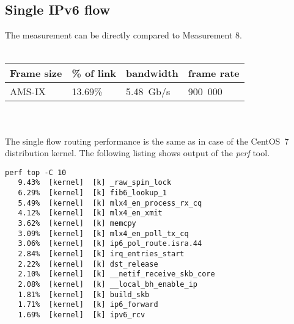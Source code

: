 
\subsection{Single IPv6 flow}
The measurement can be directly compared to Measurement 8.
\\
\\
\begin{tabular}{ | l | l | l | l | }
\hline
Frame size & \% of link & bandwidth & frame rate \\
\hline
AMS-IX & 13.69\% &  5.48~Gb/s & 900~000 \\
\hline
\end{tabular}
\\
\\
The single flow routing performance is the same as in case of the CentOS~7 distribution kernel.
The following listing shows output of the {\it{perf}} tool.
\begin{lstlisting}
perf top -C 10
   9.43%  [kernel]  [k] _raw_spin_lock
   6.29%  [kernel]  [k] fib6_lookup_1
   5.49%  [kernel]  [k] mlx4_en_process_rx_cq
   4.12%  [kernel]  [k] mlx4_en_xmit
   3.62%  [kernel]  [k] memcpy
   3.09%  [kernel]  [k] mlx4_en_poll_tx_cq
   3.06%  [kernel]  [k] ip6_pol_route.isra.44
   2.84%  [kernel]  [k] irq_entries_start
   2.22%  [kernel]  [k] dst_release
   2.10%  [kernel]  [k] __netif_receive_skb_core
   2.08%  [kernel]  [k] __local_bh_enable_ip
   1.81%  [kernel]  [k] build_skb
   1.71%  [kernel]  [k] ip6_forward
   1.69%  [kernel]  [k] ipv6_rcv
\end{lstlisting}
